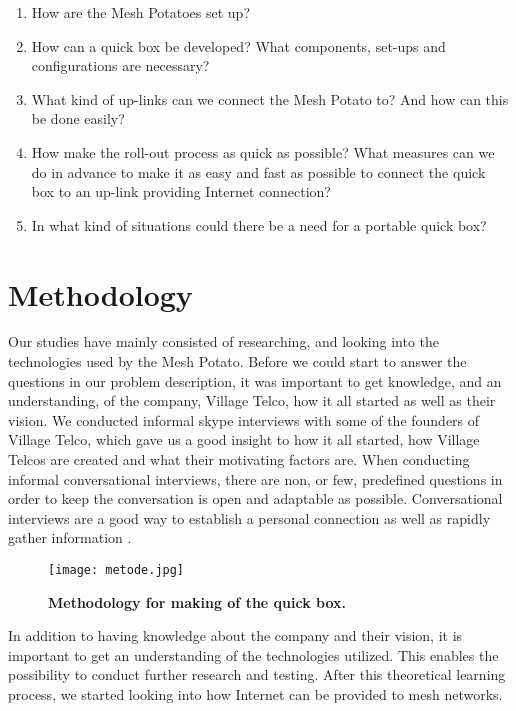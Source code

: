 \begin{enumerate}
\item How are the Mesh Potatoes set up? 
\item How can a \gls{quick} box be developed? What components, set-ups and configurations are necessary?
\item What kind of up-links can we connect the Mesh Potato to? And how can this be done easily? 
\item How make the roll-out process as quick as possible? What measures can we do in advance to make it as easy and fast as possible to connect the \gls{quick} box to an up-link providing Internet connection?
\item In what kind of situations could there be a need for a portable \gls{quick} box?
\end{enumerate}


\section{Methodology}

Our studies have mainly consisted of researching, and looking into the technologies used by the Mesh Potato. Before we could start to answer the questions in our problem description, it was important to get knowledge, and an understanding, of the company, Village Telco, how it all started as well as their vision. We conducted informal skype interviews with some of the founders of Village Telco, which gave us a good insight to how it all started, how Village Telcos are created and what their motivating factors are. When conducting informal conversational interviews, there are non, or few, predefined questions in order to keep the conversation is open and adaptable as possible. Conversational interviews are a good way to establish a personal connection as well as rapidly gather information \cite{interview}. 

\begin{figure}[b]
  \centering
      \texttt{[image: metode.jpg]}
  \caption [Methodology for making of the \gls{quick} box]{\textbf{Methodology for making of the \gls{quick} box.}}
  \label{fig:metode}
\end{figure}


In addition to having knowledge about the company and their vision, it is important to get an understanding of the technologies utilized. This enables the possibility to conduct further research and testing. After this theoretical learning process, we started looking into how Internet can be provided to mesh networks. 

